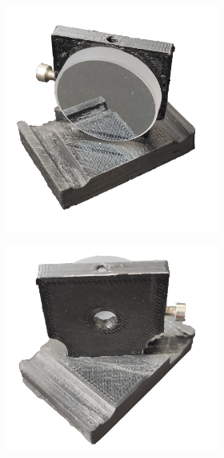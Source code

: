 \documentclass[twoside,openright,listof=numbered]{scrreprt}
\begin{document}
\begin{figure}[hbtp]
\centering
\begin{subfigure}[t]{0.66\textwidth}
\begin{subfigure}[t]{0.45\columnwidth}
\centering
\includegraphics[width=\columnwidth]{images/TAM/MirrorDropInFrontFree.png}
\end{subfigure}
\hfill
\centering
\begin{subfigure}[t]{0.45\columnwidth}
\centering
\includegraphics[width=\columnwidth]{images/TAM/MirrorDropInBackFree.png}

\end{subfigure}
\end{subfigure}
\end{figure}
\end{document}
